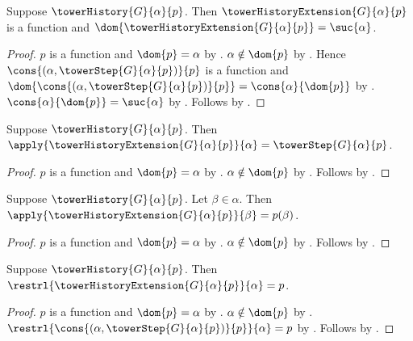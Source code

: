 \begin{proposition}\label{tower_history_extension_function}
    Suppose $\towerHistory{G}{\alpha}{p}$.
    Then $\towerHistoryExtension{G}{\alpha}{p}$ is a function and
        $\dom{\towerHistoryExtension{G}{\alpha}{p}}=\suc{\alpha}$.
\end{proposition}
\begin{proof}
    $p$ is a function and $\dom{p}=\alpha$ by
        .
    $\alpha\notin\dom{p}$ by .
    Hence $\cons{(\alpha,\towerStep{G}{\alpha}{p})}{p}$
        is a function and
        $\dom{\cons{(\alpha,\towerStep{G}{\alpha}{p})}{p}}=
            \cons{\alpha}{\dom{p}}$ by
        .
    $\cons{\alpha}{\dom{p}}=\suc{\alpha}$ by
        .
    Follows by .
\end{proof}

\begin{proposition}\label{tower_history_extension_new_value}
    Suppose $\towerHistory{G}{\alpha}{p}$.
    Then $\apply{\towerHistoryExtension{G}{\alpha}{p}}{\alpha}=
        \towerStep{G}{\alpha}{p}$.
\end{proposition}
\begin{proof}
    $p$ is a function and $\dom{p}=\alpha$ by
        .
    $\alpha\notin\dom{p}$ by .
    Follows by
        .
\end{proof}

\begin{proposition}\label{tower_history_extension_old_value}
    Suppose $\towerHistory{G}{\alpha}{p}$.
    Let $\beta\in\alpha$.
    Then $\apply{\towerHistoryExtension{G}{\alpha}{p}}{\beta}=p(\beta)$.
\end{proposition}
\begin{proof}
    $p$ is a function and $\dom{p}=\alpha$ by
        .
    $\alpha\notin\dom{p}$ by .
    Follows by
        .
\end{proof}

\begin{proposition}\label{tower_history_extension_restriction}
    Suppose $\towerHistory{G}{\alpha}{p}$.
    Then $\restrl{\towerHistoryExtension{G}{\alpha}{p}}{\alpha}=p$.
\end{proposition}
\begin{proof}
    $p$ is a function and $\dom{p}=\alpha$ by
        .
    $\alpha\notin\dom{p}$ by .
    $\restrl{
            \cons{(\alpha,\towerStep{G}{\alpha}{p})}{p}}
            {\alpha}=p$ by
        .
    Follows by
        .
\end{proof}

